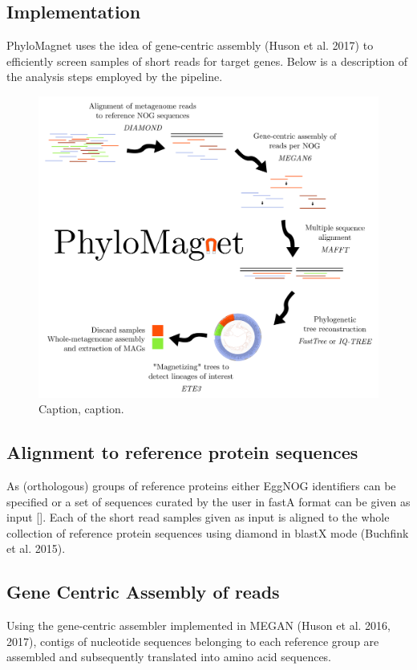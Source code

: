 \documentclass{bioinfo}
\begin{document}
\begin{methods}
\section{Implementation}
PhyloMagnet uses the idea of gene-centric assembly (Huson et al. 2017) to efficiently screen samples of short reads for target genes. Below is a description of the analysis steps employed by the pipeline. 

\begin{figure}[!tpb]%
\centerline{\includegraphics[width=\textwidth]{figures/Fig1.png}}
\caption{Caption, caption.}\label{fig:01}
\end{figure}

\subsection{Alignment to reference protein sequences}
As (orthologous) groups of reference proteins either EggNOG identifiers can be specified or a set of sequences curated by the user in fastA format can be given as input []. Each of the short read samples given as input is aligned to the whole collection of reference protein sequences using diamond in blastX mode (Buchfink et al. 2015).
\subsection{Gene Centric Assembly of reads}
Using the gene-centric assembler implemented in MEGAN (Huson et al. 2016, 2017), contigs of nucleotide sequences  belonging to each reference group are assembled and subsequently translated into amino acid sequences.

\end{methods}
\end{document}
